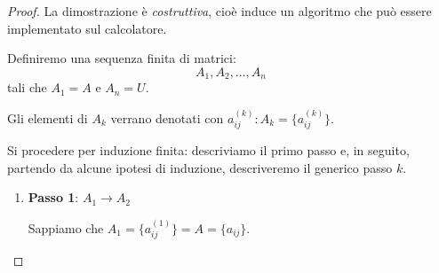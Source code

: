 \documentclass[12pt]{report}
\begin{document}
\begin{proof}
	La dimostrazione è \textit{costruttiva}, cioè induce un algoritmo che può essere implementato sul calcolatore.

	Definiremo una sequenza finita di matrici:
	\[
	A_1, A_2, \dots, A_n
	\]
	tali che $A_1 = A$  e $A_n = U$.

	Gli elementi di $A_k$ verrano denotati con $a^{(k)}_{ij}: A_k = \{a^{(k)}_{ij}\}$.

	Si procedere per induzione finita: descriviamo il primo passo e, in seguito, partendo da alcune ipotesi di induzione, descriveremo il generico passo $k$.

	\begin{enumerate}
		\item \textbf{Passo 1}: $A_1 \to A_2$

		Sappiamo che $A_1 = \{a^(1)_{ij}\} = A = \{a_{ij}\}$.


\end{enumerate}
\end{proof}
\end{document}
